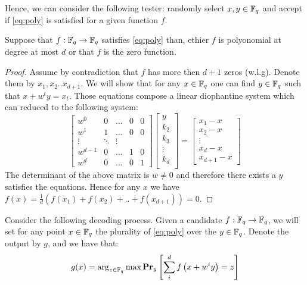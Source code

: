 Hence, we can consider the following tester: randomly select $x,y\in \FF$ and accept if \cref{eq:poly} is satisfied for a given function $f$.

\begin{claim}
  Suppose that $f : \FF \rightarrow \FF$ satisfies \cref{eq:poly} than, ethier $f$ is polyonomial at degree at most $d$ or that $f$ is the zero function.  
\end{claim}
\begin{proof}
  Assume by contradiction that $f$ has more then $d+1$ zeros (w.l.g). Denote them  by $x_{1},x_{2}.. x_{d+1}$. We will show that for any $x \in \FF $ one can find $y \in \FF$ such that $x + w^{t}y =x_{t}$. Those equations compose a linear diophantine system which can reduced to the following system: 
  \begin{equation*}  
\begin{bmatrix}
  w^{0}                     & 0 &  \dots                   &  0 &     0                 \\
                               w^{1}                & 1     &  \dots             & 0      &       0                    \\
                              \vdots                    &  \ddots               &  \vdots                    \\
                               w^{d-1}              & 0    &  \dots             &   1   &       0                    \\
                               w^{d}              & 0 & \dots       &  0     &       1
\end{bmatrix} 
\begin{bmatrix}
  y \\ 
  k_{2} \\
  k_{3} \\
  \vdots  \\
  k_{d} \\  
\end{bmatrix}
= \begin{bmatrix}
  x_{1} - x \\
  x_{2} -x \\
  \vdots \\
  x_{d} - x \\
  x_{d+1} - x
\end{bmatrix}
  \end{equation*}
  The determinant of the above matrix is $w \neq 0$ and therefore there exists a $y$ satisfies the equations. Hence for any $x$ we have $f(x) = \frac{1}{d}\left( f(x_{1}) + f(x_{2}) + .. + f(x_{d+1}) \right) = 0$.   
\end{proof}
Consider the following decoding process. Given a candidate $f : \FF \rightarrow \FF$, we will set for any point $x \in \FF$ the plurality of \cref{eq:poly} over the $y \in \FF$. Denote the output by $g$, and we have that:
\begin{equation*}
  \begin{split}
    g(x) = \arg_{z\in \FF} \max \prbm{ \sum_{i}^{d}{f\left( x + w^{i}y \right) = z }}{y}
  \end{split}
\end{equation*}

